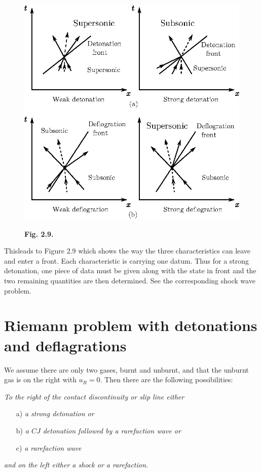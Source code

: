 \newpage


\begin{figure}[H]
\centering
\includegraphics{figures/fig2.9.eps}
\centerline{\bf Fig. 2.9.}
\end{figure}


This\pageoriginale leads to Figure 2.9 which shows the way the three characteristics can leave and enter a front. Each characteristic is carrying one datum. Thus for a strong detonation, one piece of data must be given along with the state in front and the two remaining quantities are then determined. See the corresponding shock wave problem.

\section{Riemann problem with detonations and deflagrations}\label{chap2:sec2.11}

We assume there are only two gases, burnt and unburnt, and that the unburnt gas is on the right with $u_R = 0$. Then there are the following possibilities:

\textit{To the right of the contact discontinuity or slip line either }
\begin{itemize}
\item[{\rm a)}] \textit{a strong detonation or}

\item[{\rm b)}] \textit{a $CJ$ detonation followed by a rarefaction wave or}

\item[{\rm c)}] \textit{a rarefaction wave}
\end{itemize}
\textit{and on the left either a shock or a rarefaction.}

